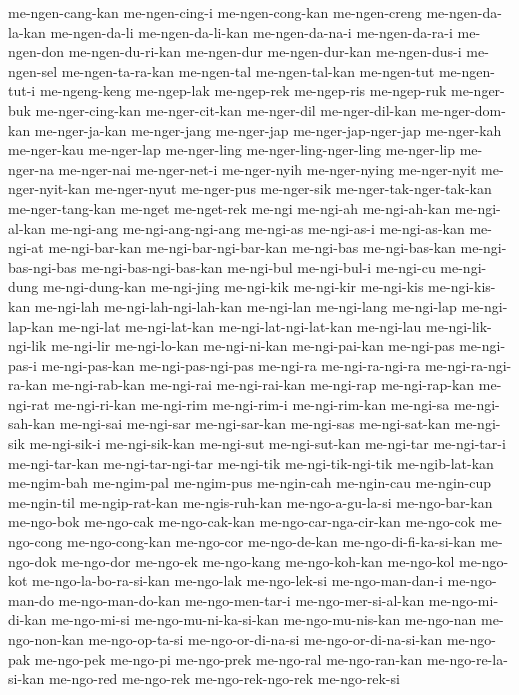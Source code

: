 {me-ngen-cang-kan me-ngen-cing-i me-ngen-cong-kan me-ngen-creng
me-ngen-da-la-kan me-ngen-da-li me-ngen-da-li-kan me-ngen-da-na-i
me-ngen-da-ra-i me-ngen-don me-ngen-du-ri-kan me-ngen-dur me-ngen-dur-kan
me-ngen-dus-i me-ngen-sel me-ngen-ta-ra-kan me-ngen-tal me-ngen-tal-kan
me-ngen-tut me-ngen-tut-i me-ngeng-keng me-ngep-lak me-ngep-rek
me-ngep-ris me-ngep-ruk me-nger-buk me-nger-cing-kan me-nger-cit-kan
me-nger-dil me-nger-dil-kan me-nger-dom-kan me-nger-ja-kan me-nger-jang
me-nger-jap me-nger-jap-nger-jap me-nger-kah me-nger-kau me-nger-lap
me-nger-ling me-nger-ling-nger-ling me-nger-lip me-nger-na me-nger-nai
me-nger-net-i me-nger-nyih me-nger-nying me-nger-nyit me-nger-nyit-kan
me-nger-nyut me-nger-pus me-nger-sik me-nger-tak-nger-tak-kan
me-nger-tang-kan me-nget me-nget-rek me-ngi me-ngi-ah me-ngi-ah-kan
me-ngi-al-kan me-ngi-ang me-ngi-ang-ngi-ang me-ngi-as me-ngi-as-i
me-ngi-as-kan me-ngi-at me-ngi-bar-kan me-ngi-bar-ngi-bar-kan me-ngi-bas
me-ngi-bas-kan me-ngi-bas-ngi-bas me-ngi-bas-ngi-bas-kan me-ngi-bul
me-ngi-bul-i me-ngi-cu me-ngi-dung me-ngi-dung-kan me-ngi-jing me-ngi-kik
me-ngi-kir me-ngi-kis me-ngi-kis-kan me-ngi-lah me-ngi-lah-ngi-lah-kan
me-ngi-lan me-ngi-lang me-ngi-lap me-ngi-lap-kan me-ngi-lat me-ngi-lat-kan
me-ngi-lat-ngi-lat-kan me-ngi-lau me-ngi-lik-ngi-lik me-ngi-lir
me-ngi-lo-kan me-ngi-ni-kan me-ngi-pai-kan me-ngi-pas me-ngi-pas-i
me-ngi-pas-kan me-ngi-pas-ngi-pas me-ngi-ra me-ngi-ra-ngi-ra
me-ngi-ra-ngi-ra-kan me-ngi-rab-kan me-ngi-rai me-ngi-rai-kan me-ngi-rap
me-ngi-rap-kan me-ngi-rat me-ngi-ri-kan me-ngi-rim me-ngi-rim-i
me-ngi-rim-kan me-ngi-sa me-ngi-sah-kan me-ngi-sai me-ngi-sar
me-ngi-sar-kan me-ngi-sas me-ngi-sat-kan me-ngi-sik me-ngi-sik-i
me-ngi-sik-kan me-ngi-sut me-ngi-sut-kan me-ngi-tar me-ngi-tar-i
me-ngi-tar-kan me-ngi-tar-ngi-tar me-ngi-tik me-ngi-tik-ngi-tik
me-ngib-lat-kan me-ngim-bah me-ngim-pal me-ngim-pus me-ngin-cah
me-ngin-cau me-ngin-cup me-ngin-til me-ngip-rat-kan me-ngis-ruh-kan
me-ngo-a-gu-la-si me-ngo-bar-kan me-ngo-bok me-ngo-cak me-ngo-cak-kan
me-ngo-car-nga-cir-kan me-ngo-cok me-ngo-cong me-ngo-cong-kan me-ngo-cor
me-ngo-de-kan me-ngo-di-fi-ka-si-kan me-ngo-dok me-ngo-dor me-ngo-ek
me-ngo-kang me-ngo-koh-kan me-ngo-kol me-ngo-kot me-ngo-la-bo-ra-si-kan
me-ngo-lak me-ngo-lek-si me-ngo-man-dan-i me-ngo-man-do me-ngo-man-do-kan
me-ngo-men-tar-i me-ngo-mer-si-al-kan me-ngo-mi-di-kan me-ngo-mi-si
me-ngo-mu-ni-ka-si-kan me-ngo-mu-nis-kan me-ngo-nan me-ngo-non-kan
me-ngo-op-ta-si me-ngo-or-di-na-si me-ngo-or-di-na-si-kan me-ngo-pak
me-ngo-pek me-ngo-pi me-ngo-prek me-ngo-ral me-ngo-ran-kan
me-ngo-re-la-si-kan me-ngo-red me-ngo-rek me-ngo-rek-ngo-rek me-ngo-rek-si
}
